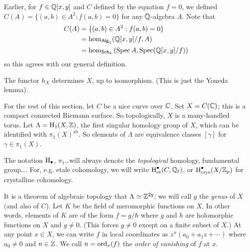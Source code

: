 \documentclass{article}
\begin{document}
Earlier, for $f\in \mathbb{Q}[x,y]$ and $C$ defined by the equation $f=0$, we 
defined $C(A)=\{(a,b)\in A^2:f(a,b)=0\}$ for any $\mathbb{Q}$-algebra $A$. 
Note that 
\begin{align*}
  C(A) &= \{(a,b)\in A^2:f(a,b) = 0\} \\
    &= \hom_{\mathsf{Alg}_{\mathbb{Q}}}(\mathbb{Q}[x,y]/f,A) \\
    &= \hom_{\mathsf{Sch}_k}\left(\operatorname{Spec} A,\operatorname{Spec}(\mathbb{Q}[x,y]/f)\right) \\
\end{align*}
so this agrees with our general definition. 

\begin{remark}
The functor $h_X$ determines $X$, up to isomorphism. (This is just the Yoneda 
lemma).
\end{remark}

For the rest of this section, let $C$ be a nice curve over $\mathbb{C}$. Set 
$X=C(\mathbb{C})$; this is a compact connected Riemann surface. So 
topologically, $X$ is a many-handled torus. Let $\Lambda=\operatorname{H}_1(X,\mathbb{Z})$, 
the first singular homology group of $X$, which can be identified with 
$\pi_1(X)^\text{ab}$. So elements of $\Lambda$ are equivalence classes 
$[\gamma]$ for $\gamma\in \pi_1(X)$. 

\begin{remark}
The notation $\operatorname{H}_\bullet$, $\pi_1$\ldots will always denote the 
\emph{topological} homology, fundamental group\ldots. For, e.g. 
etale cohomology, we will write $\operatorname{H}_\text{et}^\bullet(C,\mathbb{Q}_\ell)$, or 
$\operatorname{H}_\text{crys}^\bullet(X/\mathbb{Z}_p)$ for crystalline cohomology.
\end{remark}

It is a theorem of algebraic topology that $\Lambda\simeq\mathbb{Z}^{2 g}$; we 
will call $g$ the \emph{genus} of $X$ (and also of $C$). Let $K$ be the field 
of meromorphic functions on $X$. In other words, elements of $K$ are of the 
form $f=g/h$ where $g$ and $h$ are holomorphic functions on $X$ and $g\ne 0$. 
(This forces $g\ne 0$ except on a finite subset of $X$.) At any point 
$x\in X$, we can write $f$ in local coordinates as $z^n(a_0+a_1 z+\cdots)$ 
where $a_0\ne 0$ and $n\in\mathbb{Z}$. We call $n=\operatorname{ord}_x(f)$ the \emph{order 
of vanishing} of $f$ at $x$. 
 
\end{document}
